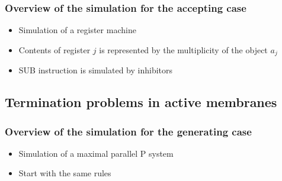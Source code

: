 
    \begin{frame}[t]\frametitle{Overview of the simulation for the accepting case}
      \begin{itemize}
        \item Simulation of a register machine
        \item Contents of register $j$ is represented by the multiplicity of the object $a_j$
        \item SUB instruction is simulated by inhibitors
      \end{itemize}
    \end{frame}
    \note{}


  \subsection{Termination problems in active membranes} %
  \label{sub:termination_problems_in_active_membranes}

    \begin{frame}[t]\frametitle{Overview of the simulation for the generating case}
      \begin{itemize}
        \item Simulation of a maximal parallel P system
        \item Start with the same rules
      \end{itemize}
      \simulationpicture
    \end{frame}
    \note{}

